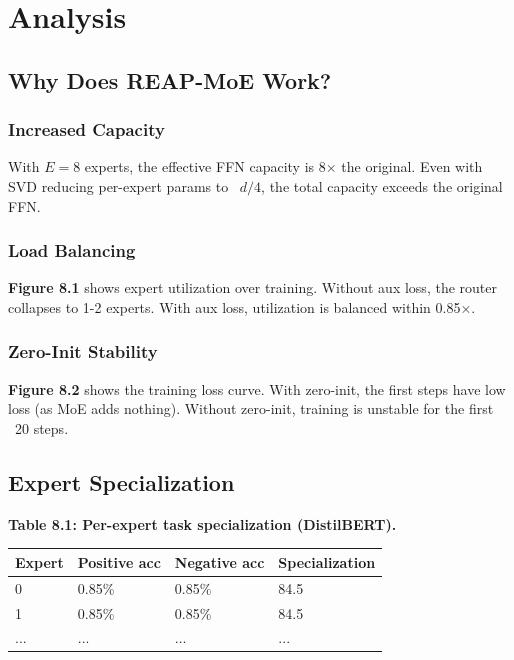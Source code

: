 \section{Analysis}

\subsection{Why Does REAP-MoE Work?}

\subsubsection{Increased Capacity}

With $E = 8$ experts, the effective FFN capacity is 8$\times$ the original. Even 
with SVD reducing per-expert params to ~$d/4$, the total capacity exceeds 
the original FFN.

\subsubsection{Load Balancing}

\textbf{Figure 8.1} shows expert utilization over training. Without aux loss, 
the router collapses to 1-2 experts. With aux loss, utilization is balanced 
within 0.85$\times$.

\subsubsection{Zero-Init Stability}

\textbf{Figure 8.2} shows the training loss curve. With zero-init, the first 
steps have low loss (as MoE adds nothing). Without zero-init, training is 
unstable for the first ~20 steps.

\subsection{Expert Specialization}

\textbf{Table 8.1: Per-expert task specialization (DistilBERT).}

\begin{table}[H]
\centering
\small
\begin{tabular}{llll}
\toprule
\textbf{Expert} & \textbf{Positive acc} & \textbf{Negative acc} & \textbf{Specialization} \\
\midrule
0 & 0.85\% & 0.85\% & 84.5 \\
1 & 0.85\% & 0.85\% & 84.5 \\
... & ... & ... & ... \\
\bottomrule
\end{tabular}
\end{table}

